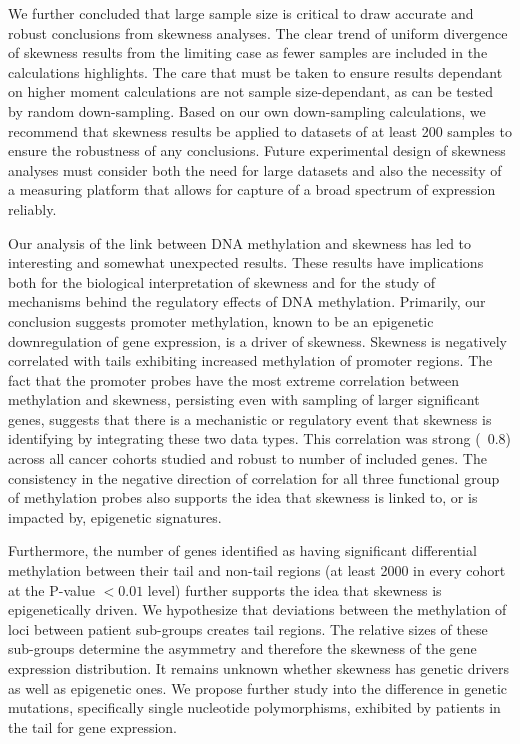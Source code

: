 \documentclass[11pt]{article}
\begin{document}
We further concluded that large sample size is critical to draw accurate and robust conclusions from skewness analyses. The clear trend of uniform divergence of skewness results from the limiting case as fewer samples are included in the calculations highlights. The care that must be taken to ensure results dependant on higher moment calculations are not sample size-dependant, as can be tested by random down-sampling. Based on our own down-sampling calculations, we recommend that skewness results be applied to datasets of at least 200 samples to ensure the robustness of any conclusions. Future experimental design of skewness analyses must consider both the need for large datasets and also the necessity of a measuring platform that allows for capture of a broad spectrum of expression reliably.
\newline

Our analysis of the link between DNA methylation and skewness has led to interesting and somewhat unexpected results. These results have implications both for the biological interpretation of skewness and for the study of mechanisms behind the regulatory effects of DNA methylation. Primarily, our conclusion suggests promoter methylation, known to be an epigenetic downregulation of gene expression, is a driver of skewness. Skewness is negatively correlated with tails exhibiting increased methylation of promoter regions. The fact that the promoter probes have the most extreme correlation between methylation and skewness, persisting even with sampling of larger significant genes, suggests that there is a mechanistic or regulatory event that skewness is identifying by integrating these two data types. This correlation was strong (~0.8) across all cancer cohorts studied and robust to number of included genes. The consistency in the negative direction of correlation for all three functional group of methylation probes also supports the idea that skewness is linked to, or is impacted by, epigenetic signatures.
\newline

Furthermore, the number of genes identified as having significant differential methylation between their tail and non-tail regions (at least 2000 in every cohort at the P-value $< 0.01$ level) further supports the idea that skewness is epigenetically driven. We hypothesize that deviations between the methylation of loci between patient sub-groups creates tail regions. The relative sizes of these sub-groups determine the asymmetry and therefore the skewness of the gene expression distribution. It remains unknown whether skewness has genetic drivers as well as epigenetic ones. We propose further study into the difference in genetic mutations, specifically single nucleotide polymorphisms, exhibited by patients in the tail for gene expression. 
\newline
\end{document}
